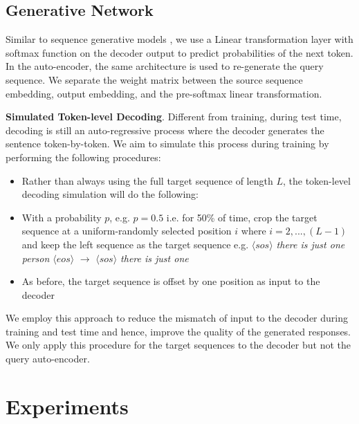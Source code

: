 \documentclass[11pt,a4paper]{article}
\begin{document}
\subsection{Generative Network}
Similar to sequence generative models \cite{Sutskever14seq2seq,Manning2017ACS}, we use a Linear transformation layer with softmax function on the decoder output to predict probabilities of the next token. In the auto-encoder, the same architecture is used to re-generate the query sequence. We separate the weight matrix between the source sequence embedding, output embedding, and the pre-softmax linear transformation. 


\textbf{Simulated Token-level Decoding}. Different from training, during test time, decoding is still an auto-regressive process where the decoder generates the sentence token-by-token. We aim to simulate this process during training by performing the following procedures: 
\begin{itemize}
    \item Rather than always using the full target sequence of length $L$, the token-level decoding simulation will do the following:
    \item With a probability $p$, e.g. $p=0.5$ i.e. for 50\% of time, crop the target sequence at a uniform-randomly selected position $i$ where $i=2,...,(L-1)$ and keep the left sequence as the target sequence e.g. \textit{$\langle sos \rangle $ there is just one person $\langle eos \rangle $} $\rightarrow$ \textit{$\langle sos \rangle$ there is just one}
    \item As before, the target sequence is offset by one position as input to the decoder
\end{itemize}

We employ this approach to reduce the mismatch of input to the decoder during training and test time and hence, improve the quality of the generated responses. We only apply this procedure for the target sequences to the decoder but not the query auto-encoder.

\section{Experiments}
\end{document}
